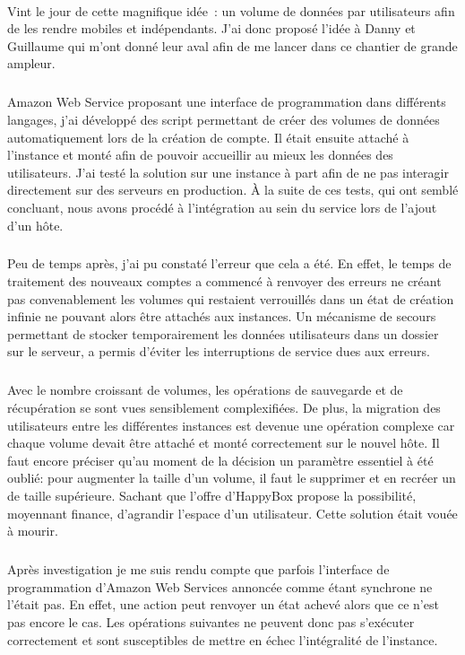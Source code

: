 \documentclass[11pt, a4paper ]{article}
\begin{document}
\begin{spacing}{1.5}
\paragraph{}
Vint le jour de cette magnifique idée : un volume de données par utilisateurs afin de les rendre mobiles et indépendants. J'ai donc proposé l'idée à Danny et Guillaume qui m'ont donné leur aval afin de me lancer dans ce chantier de grande ampleur.
\subparagraph{}
Amazon Web Service proposant une interface de programmation dans différents langages, j'ai développé des script permettant de créer  des volumes de données automatiquement lors de la création de compte. Il était ensuite attaché à l'instance et monté afin de pouvoir accueillir au mieux les données des utilisateurs.
J'ai testé la solution sur une instance à part afin de ne pas interagir directement sur des serveurs en production. À la suite de ces tests, qui ont semblé concluant, nous avons procédé à l'intégration au sein du service lors de l'ajout d'un hôte.
\subparagraph{}
Peu de temps après, j'ai pu constaté l'erreur que cela a été. En effet, le temps de traitement des nouveaux comptes a commencé à renvoyer des erreurs ne créant pas convenablement les volumes qui restaient verrouillés dans un état de création infinie ne pouvant alors être attachés aux instances. Un mécanisme de secours permettant de stocker temporairement les données utilisateurs dans un dossier sur le serveur, a permis d'éviter les interruptions de service dues aux erreurs.
\subparagraph{}
Avec le nombre croissant de volumes, les opérations de sauvegarde et de récupération se sont vues sensiblement complexifiées. De plus, la migration des utilisateurs entre les différentes instances est devenue une opération complexe car chaque volume devait être attaché et monté correctement sur le nouvel hôte. Il faut encore préciser qu'au moment de la décision un paramètre essentiel à été oublié: pour augmenter la taille d'un volume, il faut le supprimer et en recréer un de taille supérieure. Sachant que l'offre d'HappyBox propose la possibilité, moyennant finance, d'agrandir l'espace d'un utilisateur. Cette solution était vouée à mourir.
\subparagraph{}
Après investigation je me suis rendu compte que parfois l'interface de programmation d'Amazon Web Services annoncée comme étant synchrone ne l'était pas. En effet, une action peut renvoyer un état achevé alors que ce n'est pas encore le cas. Les opérations suivantes ne peuvent donc pas s'exécuter correctement et sont susceptibles de mettre en échec l'intégralité de l'instance.


\end{spacing}
\end{document}
